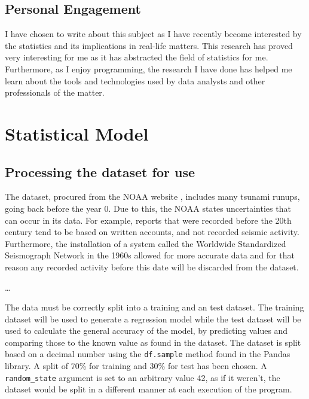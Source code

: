 \documentclass[11pt,letterpaper]{article}
\begin{document}
\subsection{Personal Engagement}

I have chosen to write about this subject as I have recently become interested by the 
statistics and its implications in real-life matters. This research has proved very 
interesting for me as it has abstracted the field of statistics for me. Furthermore, 
as I enjoy programming, the research I have done has helped me learn about the tools 
and technologies used by data analysts and other professionals of the matter. 


\section{}


\section{Statistical Model}

\subsection{Processing the dataset for use}

The dataset, procured from the NOAA website \cite{noaa}, includes many tsunami 
runups, going back before the year 0. Due to this, the NOAA states uncertainties 
that can occur in its data. For example, reports that were recorded before the 
20th century tend to be based on written accounts, and not recorded seismic activity. 
Furthermore, the installation of a system called the Worldwide Standardized Seismograph 
Network in the 1960s allowed for more accurate data and for that reason any recorded 
activity before this date will be discarded from the dataset.

\dots

The data must be correctly split into a training and an test dataset. The training 
dataset will be used to generate a regression model while the test dataset will 
be used to calculate the general accuracy of the model, by predicting values and 
comparing those to the known value as found in the dataset. The dataset is split based on 
a decimal number using the \verb|df.sample| method found in the Pandas library. A split 
of 70\% for training and 30\% for test has been chosen. A \verb|random_state| argument is 
set to an arbitrary value 42, as if it weren't, the dataset would be split in a different 
manner at each execution of the program. 
\end{document}
